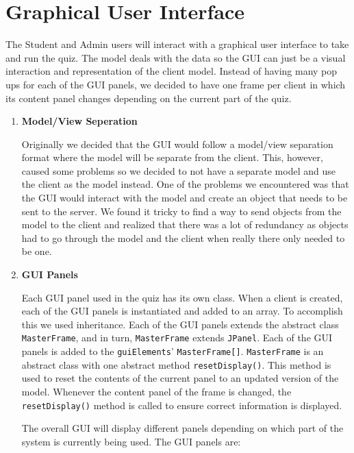 \section{Graphical User Interface}
\label{sec:graphical_user_interface}

The Student and Admin users will interact with a graphical user interface to
take and run the quiz. The model deals with the data so the GUI can just be a
visual interaction and representation of the client model. Instead of having
many pop ups for each of the GUI panels, we decided to have one frame per
client in which its content panel changes depending on the current part of the
quiz.

\begin{enumerate}

	\item \textbf{Model/View Seperation}

		Originally we decided that the GUI would follow a model/view separation
		format where the model will be separate from the client. This, however,
		caused some problems so we decided to not have a separate model and use
		the client as the model instead. One of the problems we encountered was
		that the GUI would interact with the model and create an object that
		needs to be sent to the server. We found it tricky to find a way to
		send objects from the model to the client and realized that there was a
		lot of redundancy as objects had to go through the model and the client
		when really there only needed to be one.

	\item \textbf{GUI Panels}

		Each GUI panel used in the quiz has its own class.  When a client is
		created, each of the GUI panels is instantiated and added to an array.
		To accomplish this we used inheritance. Each of the GUI panels extends
		the abstract class \texttt{MasterFrame}, and in turn,
		\texttt{MasterFrame} extends \texttt{JPanel}.  Each of the GUI panels
		is added to the \texttt{guiElements}' \texttt{MasterFrame[]}.
		\texttt{MasterFrame} is an abstract class with one abstract method
		\verb+resetDisplay()+.  This method is used to reset the contents of
		the current panel to an updated version of the model.  Whenever the
		content panel of the frame is changed, the \verb+resetDisplay()+ method
		is called to ensure correct information is displayed.

		The overall GUI will display different panels depending on which part of
		the system is currently being used. The GUI panels are:


\end{enumerate}
